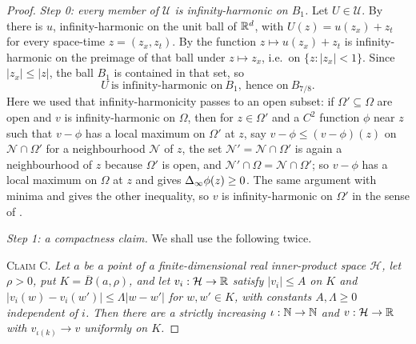 \begin{proof}
\emph{Step 0: every member of $\mathcal U$ is infinity-harmonic on $B_1$.}
Let $U\in\mathcal U$. By  there is $u$,
infinity-harmonic on the unit ball of $\mathbb{R}^d$, with $U(z)=u(z_x)+z_t$ for every
space-time $z=(z_x,z_t)$. By  the function
$z\mapsto u(z_x)+z_t$ is infinity-harmonic on the preimage of that ball under
$z\mapsto z_x$, i.e.\ on $\{z:|z_x|<1\}$. Since $|z_x|\le|z|$, the ball $B_1$ is
contained in that set, so
\begin{equation}\label{eq:ff-harm}
  U\ \text{is infinity-harmonic on}\ B_1,\ \text{hence on}\ B_{7/8}.
\end{equation}
Here we used that infinity-harmonicity passes to an open subset: if
$\Omega'\subseteq\Omega$ are open and $v$ is infinity-harmonic on $\Omega$, then
for $z\in\Omega'$ and a $C^2$ function $\phi$ near $z$ such that $v-\phi$ has a
local maximum on $\Omega'$ at $z$, say $v-\phi\le(v-\phi)(z)$ on
$\mathcal N\cap\Omega'$ for a neighbourhood $\mathcal N$ of $z$, the set
$\mathcal N'=\mathcal N\cap\Omega'$ is again a neighbourhood of $z$ because
$\Omega'$ is open, and $\mathcal N'\cap\Omega=\mathcal N\cap\Omega'$; so
$v-\phi$ has a local maximum on $\Omega$ at $z$ and
 gives $\Delta_{\infty}\phi(z)\ge0$. The same argument with
minima and  gives the other inequality, so $v$ is
infinity-harmonic on $\Omega'$ in the sense of .

\emph{Step 1: a compactness claim.}
We shall use the following twice.

\textsc{Claim C.} \emph{Let $a$ be a point of a finite-dimensional real
inner-product space $\mathcal H$, let $\rho>0$, put
$K=\overline B(a,\rho)$, and let $v_i:\mathcal H\to\mathbb{R}$ satisfy
$|v_i|\le A$ on $K$ and $|v_i(w)-v_i(w')|\le\Lambda|w-w'|$ for $w,w'\in K$, with
constants $A,\Lambda\ge0$ independent of $i$. Then there are a strictly
increasing $\iota:\mathbb{N}\to\mathbb{N}$ and $v:\mathcal H\to\mathbb{R}$ with
$v_{\iota(k)}\to v$ uniformly on $K$.}


\end{proof}
